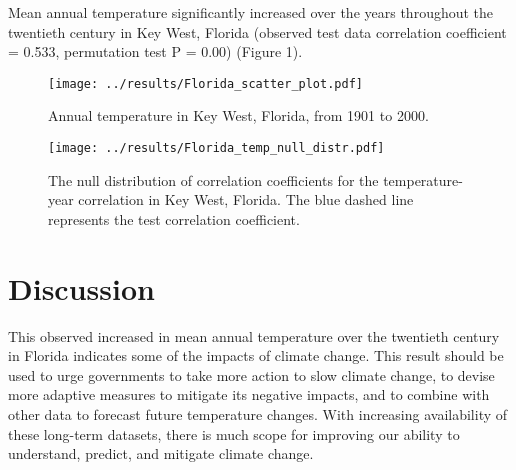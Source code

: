 \documentclass{article}
\begin{document}
    Mean annual temperature significantly increased over the years throughout the twentieth century in Key West, Florida (observed test data correlation coefficient = 0.533, permutation test P = 0.00) (Figure 1). \vspace{-0.5em}

    \begin{figure}[htbp]
    \centering
    \begin{minipage}{.5\textwidth}
        \centering
        \texttt{[image: ../results/Florida\_scatter\_plot.pdf]}
        \caption{Annual temperature in Key West, Florida, \newline from 1901 to 2000.}
        \label{fig.test1}
    \end{minipage}%
    \begin{minipage}{.5\textwidth}
        \centering
        \texttt{[image: ../results/Florida\_temp\_null\_distr.pdf]}
        \caption{The null distribution of correlation coefficients for the temperature-year correlation in Key West, Florida. The blue dashed line represents the test correlation coefficient.}
        \label{fig:test2}
    \end{minipage}
    \end{figure}\vspace{-1.5em}

\section{Discussion \vspace{-0.5em}}

    This observed increased in mean annual temperature over the twentieth century in Florida indicates some of the impacts of climate change. This result should be used to urge governments to take more action to slow climate change, to devise more adaptive measures to mitigate its negative impacts, and to combine with other data to forecast future temperature changes. With increasing availability of these long-term datasets, there is much scope for improving our ability to understand, predict, and mitigate climate change. \vspace{-1em}


	
\end{document}
